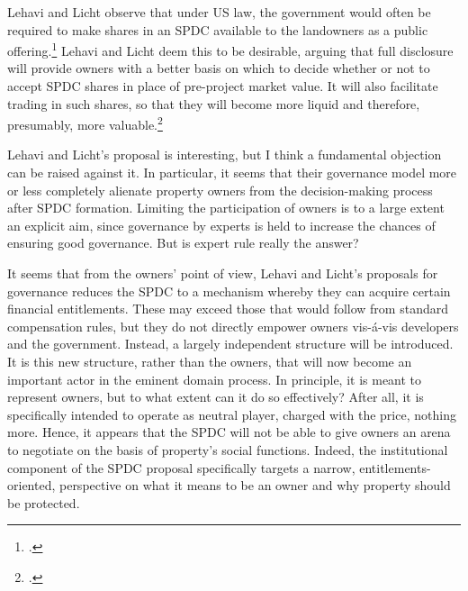 {Lehavi and Licht observe that under US law, the government would often be required to make shares in an SPDC available to the landowners as a public offering.\footcite[1745]{lehavi07} Lehavi and Licht deem this to be desirable, arguing that full disclosure will provide owners with a better basis on which to decide whether or not to accept SPDC shares in place of pre-project market value. It will also facilitate trading in such shares, so that they will become more liquid and therefore, presumably, more valuable.\footcite[1746]{lehavi07} 

Lehavi and Licht's proposal is interesting, but I think a fundamental objection can be raised against it. In particular, it seems that their governance model more or less completely alienate property owners from the decision-making process after SPDC formation. Limiting the participation of owners is to a large extent an explicit aim, since governance by experts is held to increase the chances of ensuring good governance. But is expert rule really the answer?

It seems that from the owners' point of view, Lehavi and Licht's proposals for governance reduces the SPDC to a mechanism whereby they can acquire certain financial entitlements. These may exceed those that would follow from standard compensation rules, but they do not directly empower owners vis-{\'a}-vis developers and the government. Instead, a largely independent structure will be introduced. It is this new  structure, rather than the owners, that will now become an important actor in the eminent domain process. In principle, it is meant to represent owners, but to what extent can it do so effectively? After all, it is specifically intended to operate as neutral player, charged with  the price, nothing more. Hence, it appears that the SPDC will not be able to give owners an arena to negotiate on the basis of property's social functions. Indeed, the institutional component of the SPDC proposal specifically targets a narrow, entitlements-oriented, perspective on what it means to be an owner and why property should be protected. 

}
